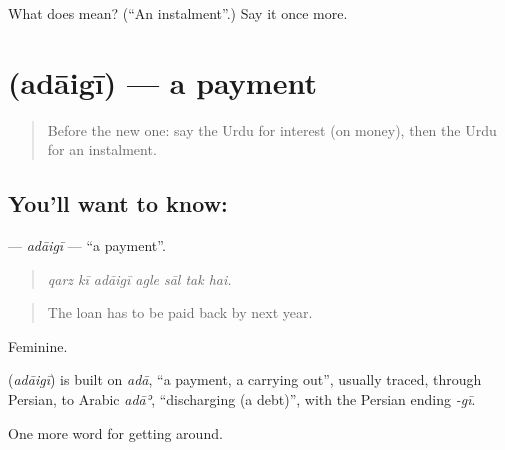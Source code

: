 \begin{tcolorbox}[breakable,colback=teal!4,colframe=teal!35!black,title={Before you move on}]
What does  mean? (\textquotedblleft{}An instalment\textquotedblright{}.) Say it once more.
\end{tcolorbox}
\section[\texorpdfstring{\ur{ادائیگی} (adāigī)}{ادائیگی (adāigī)}]{ (adāigī) — a payment}

\label{lesson:UR-C418-adaigi}



\begin{quote}
Before the new one: say the Urdu for interest (on money), then the Urdu for an instalment.
\end{quote}

\subsection*{You'll want to know: }
\textbf{} — \emph{adāigī} — \textquotedblleft{}a payment\textquotedblright{}.

\begin{quote}
      
\end{quote}

\begin{quote}
\emph{qarz kī adāigī agle sāl tak hai.}
\end{quote}

\begin{quote}
The loan has to be paid back by next year.
\end{quote}

Feminine.

\begin{cousinweb}
\textbf{} (\emph{adāigī}) is built on \emph{adā}, \textquotedblleft{}a payment, a carrying out\textquotedblright{}, usually traced, through Persian, to Arabic \emph{adāʾ}, \textquotedblleft{}discharging (a debt)\textquotedblright{}, with the Persian ending \emph{-gī}.
\end{cousinweb}

\begin{grammarlens}[title={What you've built}]
One more word for getting around.
\end{grammarlens}

